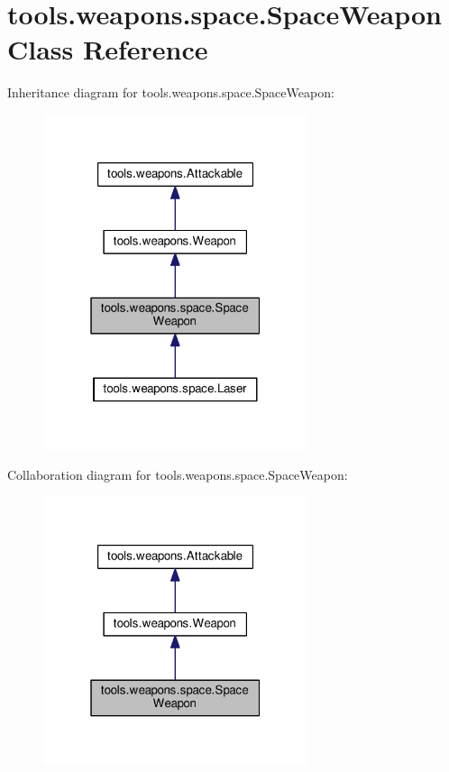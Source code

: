 \hypertarget{classtools_1_1weapons_1_1space_1_1_space_weapon}{}\section{tools.\+weapons.\+space.\+Space\+Weapon Class Reference}
\label{classtools_1_1weapons_1_1space_1_1_space_weapon}


Inheritance diagram for tools.\+weapons.\+space.\+Space\+Weapon\+:\nopagebreak
\begin{figure}[H]
\begin{center}
\leavevmode
\includegraphics[width=220pt]{classtools_1_1weapons_1_1space_1_1_space_weapon__inherit__graph}
\end{center}
\end{figure}


Collaboration diagram for tools.\+weapons.\+space.\+Space\+Weapon\+:\nopagebreak
\begin{figure}[H]
\begin{center}
\leavevmode
\includegraphics[width=220pt]{classtools_1_1weapons_1_1space_1_1_space_weapon__coll__graph}
\end{center}
\end{figure}
